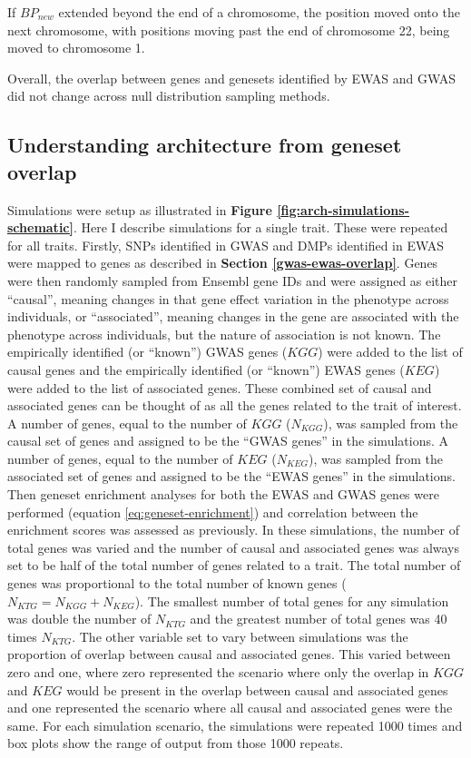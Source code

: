 \documentclass[11pt,oneside]{bristolthesis}
\begin{document}
If \(BP_{new}\) extended beyond the end of a chromosome, the position moved onto the next chromosome, with positions moving past the end of chromosome 22, being moved to chromosome 1.

Overall, the overlap between genes and genesets identified by EWAS and GWAS did not change across null distribution sampling methods.

\hypertarget{architecture-sims-method}{%
\subsection{Understanding architecture from geneset overlap}\label{architecture-sims-method}}

Simulations were setup as illustrated in \textbf{Figure \ref{fig:arch-simulations-schematic}}. Here I describe simulations for a single trait. These were repeated for all traits. Firstly, SNPs identified in GWAS and DMPs identified in EWAS were mapped to genes as described in \textbf{Section \ref{gwas-ewas-overlap}}. Genes were then randomly sampled from Ensembl gene IDs and were assigned as either ``causal'', meaning changes in that gene effect variation in the phenotype across individuals, or ``associated'', meaning changes in the gene are associated with the phenotype across individuals, but the nature of association is not known. The empirically identified (or ``known'') GWAS genes (\(KGG\)) were added to the list of causal genes and the empirically identified (or ``known'') EWAS genes (\(KEG\)) were added to the list of associated genes. These combined set of causal and associated genes can be thought of as all the genes related to the trait of interest. A number of genes, equal to the number of \(KGG\) (\(N_{KGG}\)), was sampled from the causal set of genes and assigned to be the ``GWAS genes'' in the simulations. A number of genes, equal to the number of \(KEG\) (\(N_{KEG}\)), was sampled from the associated set of genes and assigned to be the ``EWAS genes'' in the simulations. Then geneset enrichment analyses for both the EWAS and GWAS genes were performed (equation \eqref{eq:geneset-enrichment}) and correlation between the enrichment scores was assessed as previously. In these simulations, the number of total genes was varied and the number of causal and associated genes was always set to be half of the total number of genes related to a trait. The total number of genes was proportional to the total number of known genes (\(N_{KTG} = N_{KGG} + N_{KEG}\)). The smallest number of total genes for any simulation was double the number of \(N_{KTG}\) and the greatest number of total genes was 40 times \(N_{KTG}\). The other variable set to vary between simulations was the proportion of overlap between causal and associated genes. This varied between zero and one, where zero represented the scenario where only the overlap in \(KGG\) and \(KEG\) would be present in the overlap between causal and associated genes and one represented the scenario where all causal and associated genes were the same. For each simulation scenario, the simulations were repeated 1000 times and box plots show the range of output from those 1000 repeats.
\end{document}
